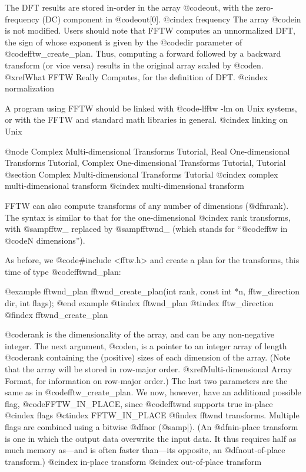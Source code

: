 The DFT results are stored in-order in the array @code{out}, with the
zero-frequency (DC) component in @code{out[0]}.
@cindex frequency
The array @code{in} is not modified.  Users should note that FFTW
computes an unnormalized DFT, the sign of whose exponent is given by the
@code{dir} parameter of @code{fftw_create_plan}.  Thus, computing a
forward followed by a backward transform (or vice versa) results in the
original array scaled by @code{n}.  @xref{What FFTW Really Computes},
for the definition of DFT.
@cindex normalization

A program using FFTW should be linked with @code{-lfftw -lm} on Unix
systems, or with the FFTW and standard math libraries in general.
@cindex linking on Unix

@node Complex Multi-dimensional Transforms Tutorial, Real One-dimensional Transforms Tutorial, Complex One-dimensional Transforms Tutorial, Tutorial
@section Complex Multi-dimensional Transforms Tutorial
@cindex complex multi-dimensional transform
@cindex multi-dimensional transform

FFTW can also compute transforms of any number of dimensions
(@dfn{rank}).  The syntax is similar to that for the one-dimensional
@cindex rank
transforms, with @samp{fftw_} replaced by @samp{fftwnd_} (which stands
for ``@code{fftw} in @code{N} dimensions'').

As before, we @code{#include <fftw.h>} and create a plan for the
transforms, this time of type @code{fftwnd_plan}:

@example
fftwnd_plan fftwnd_create_plan(int rank, const int *n,
                               fftw_direction dir, int flags);
@end example
@tindex fftwnd_plan
@tindex fftw_direction
@findex fftwnd_create_plan

@code{rank} is the dimensionality of the array, and can be any
non-negative integer.  The next argument, @code{n}, is a pointer to an
integer array of length @code{rank} containing the (positive) sizes of
each dimension of the array.  (Note that the array will be stored in
row-major order. @xref{Multi-dimensional Array Format}, for information
on row-major order.)  The last two parameters are the same as in
@code{fftw_create_plan}.  We now, however, have an additional possible
flag, @code{FFTW_IN_PLACE}, since @code{fftwnd} supports true in-place
@cindex flags
@ctindex FFTW_IN_PLACE
@findex fftwnd
transforms.  Multiple flags are combined using a bitwise @dfn{or}
(@samp{|}).  (An @dfn{in-place} transform is one in which the output
data overwrite the input data.  It thus requires half as much memory
as---and is often faster than---its opposite, an @dfn{out-of-place}
transform.)
@cindex in-place transform
@cindex out-of-place transform

